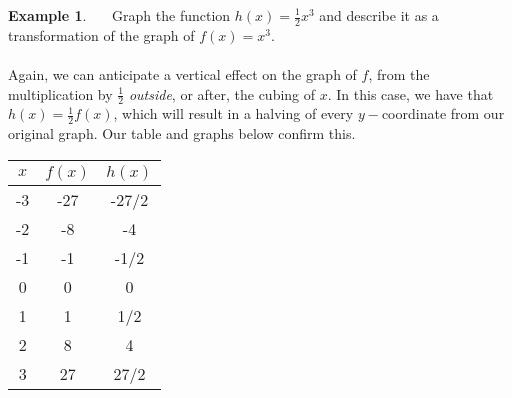 \documentclass[11pt]{book}
\theoremstyle{definition}  %
\newtheorem{example}{Example}[chapter]
\begin{document}
\begin{example}~~~Graph the function $h(x)=\frac{1}{2}x^3$ and describe it as a transformation of the graph of $f(x)=x^3$.\\
~\\
Again, we can anticipate a vertical effect on the graph of $f$, from the multiplication by $\frac{1}{2}$ \textit{outside}, or after, the cubing of $x$.  In this case, we have that $h(x)=\frac{1}{2}f(x)$, which will result in a halving of every $y-$coordinate from our original graph.  Our table and graphs below confirm this. 

\begin{multicols}{2}
\begin{center}
\begin{tabular}{c||c|c}
$x$ & $f(x)$ &  $h(x)$ \\
\hline
-3 & -27 &  -27/2 \\
-2 & -8 &  -4 \\
-1 & -1 &  -1/2 \\
0 & 0 &  0 \\
1 & 1 &  1/2 \\
2 & 8 &  4 \\
3 & 27 &  27/2 \\
\end{tabular}
\end{center}


\end{multicols}
\end{example}
\end{document}
